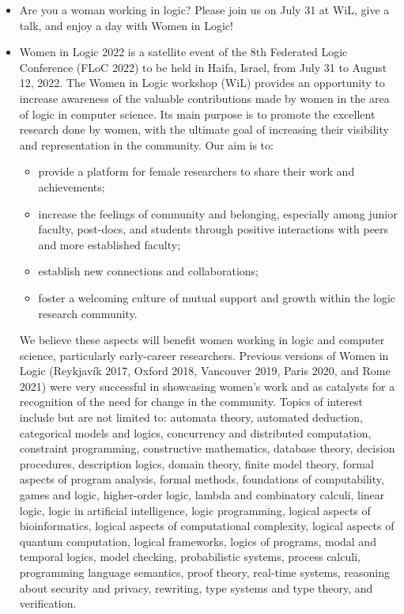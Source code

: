 \documentclass[prodmode,acmtecs]{acmsmall} %
\begin{document}
\begin{itemize}\item  Are you a woman working in logic? Please join us on July 31 at WiL, give a talk, and enjoy a day with Women in Logic! 
 
\item  Women in Logic 2022 is a satellite event of the 8th Federated Logic Conference (FLoC 2022) to be held in Haifa, Israel, from July 31 to August 12, 2022. The Women in Logic workshop (WiL) provides an opportunity to increase awareness of the valuable contributions made by women in the area of logic in computer science. Its main purpose is to promote the excellent research done by women, with the ultimate goal of increasing their visibility and representation in the community. Our aim is to: 
 
\begin{itemize}\item  provide a platform for female researchers to share their work and achievements;
\item  increase the feelings of community and belonging, especially among junior faculty, post-docs, and students through positive interactions with peers and more established faculty;
\item  establish new connections and collaborations;
\item  foster a welcoming culture of mutual support and growth within the logic research community. 
\end{itemize} 
  We believe these aspects will benefit women working in logic and computer science, particularly early-career researchers. Previous versions of Women in Logic (Reykjavík 2017, Oxford 2018, Vancouver 2019, Paris 2020, and Rome 2021) were very successful in showcasing women's work and as catalysts for a recognition of the need for change in the community. Topics of interest include but are not limited to: automata theory, automated deduction, categorical models and logics, concurrency and distributed computation, constraint programming, constructive mathematics, database theory, decision procedures, description logics, domain theory, finite model theory, formal aspects of program analysis, formal methods, foundations of computability, games and logic, higher-order logic, lambda and combinatory calculi, linear logic, logic in artificial intelligence, logic programming, logical aspects of bioinformatics, logical aspects of computational complexity, logical aspects of quantum computation, logical frameworks, logics of programs, modal and temporal logics, model checking, probabilistic systems, process calculi, programming language semantics, proof theory, real-time systems, reasoning about security and privacy, rewriting, type systems and type theory, and verification.  
 

\end{itemize}
\end{document}
